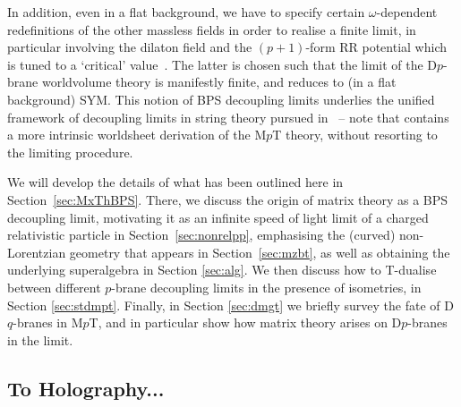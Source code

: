 \documentclass[11pt]{article}
\begin{document}
In addition, even in a flat background, we have to specify certain $\omega$-dependent redefinitions of the other massless fields in order to realise a finite limit, in particular involving the dilaton field and the $(p+1)$-form RR potential which is tuned to a `critical' value~\cite{Gopakumar:2000ep, Gomis:2000bd}. The latter is chosen such that the limit of the D$p$-brane worldvolume theory is manifestly finite, and reduces to (in a flat background) SYM. This notion of BPS decoupling limits underlies the unified framework of decoupling limits in string theory pursued in~\cite{Blair:2023noj, Gomis:2023eav} -- note that \cite{Gomis:2023eav} contains a more intrinsic worldsheet derivation of the M$p$T theory, without resorting to the limiting procedure. 

\vspace{3mm}

We will develop the details of what has been outlined here in Section~\ref{sec:MxThBPS}. There, we discuss the origin of matrix theory as a BPS decoupling limit, motivating it as an infinite speed of light limit of a charged relativistic particle in Section~\ref{sec:nonrelpp}, emphasising the (curved) non-Lorentzian geometry that appears in Section~\ref{sec:mzbt}, as well as obtaining the underlying superalgebra in Section \ref{sec:alg}.
We then discuss how to T-dualise between different $p$-brane decoupling limits in the presence of isometries, in Section \ref{sec:stdmpt}.
Finally, in Section \ref{sec:dmgt} we briefly survey the fate of D$q$-branes in M$p$T, and in particular show how matrix theory arises on D$p$-branes in the limit. 

\subsection{To Holography...} 
\end{document}
